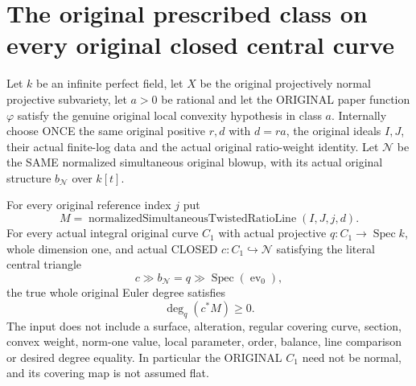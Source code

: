 \section{The original prescribed class on every original closed central curve}

\begin{theorem}
\label{thm:intrinsic-numerical-original-central-curve-degree}
\leanok
{}
Let $k$ be an infinite perfect field, let $X$ be the original
projectively normal projective subvariety, let $a>0$ be rational and let
the ORIGINAL paper function $\varphi$ satisfy the genuine original local
convexity hypothesis in class $a$.  Internally choose ONCE the same
original positive $r,d$ with $d=ra$, the original ideals $I,J$, their
actual finite-log data and the actual original ratio-weight identity.
Let $\mathcal N$ be the SAME normalized simultaneous original blowup,
with its actual original structure $b_{\mathcal N}$ over $k[t]$.

For every original reference index $j$ put
\[
 M=\operatorname{normalizedSimultaneousTwistedRatioLine}(I,J,j,d).
\]
For every actual integral original curve $C_1$ with actual projective
$q:C_1\to\operatorname{Spec}k$, whole dimension one, and actual CLOSED
$c:C_1\hookrightarrow\mathcal N$ satisfying the literal central triangle
\[
 c\gg b_{\mathcal N}=q\gg\operatorname{Spec}(\operatorname{ev}_0),
\]
the true whole original Euler degree satisfies
\[
 \deg_q(c^*M)\ge0.
\]
The input does not include a surface, alteration, regular covering curve,
section, convex weight, norm-one value, local parameter, order, balance,
line comparison or desired degree equality.  In particular the ORIGINAL
$C_1$ need not be normal, and its covering map is not assumed flat.
\end{theorem}
